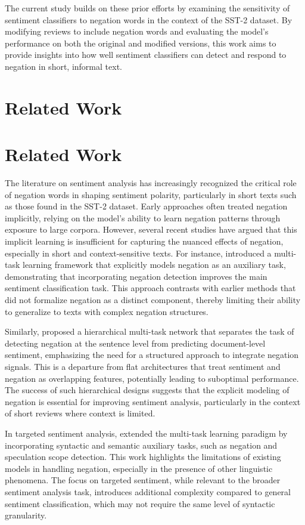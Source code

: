 \documentclass{article}
\begin{document}
The current study builds on these prior efforts by examining the sensitivity of sentiment classifiers to negation words in the context of the SST-2 dataset. By modifying reviews to include negation words and evaluating the model's performance on both the original and modified versions, this work aims to provide insights into how well sentiment classifiers can detect and respond to negation in short, informal text.
\section{Related Work}
\section{Related Work}

The literature on sentiment analysis has increasingly recognized the critical role of negation words in shaping sentiment polarity, particularly in short texts such as those found in the SST-2 dataset. Early approaches often treated negation implicitly, relying on the model's ability to learn negation patterns through exposure to large corpora. However, several recent studies have argued that this implicit learning is insufficient for capturing the nuanced effects of negation, especially in short and context-sensitive texts. For instance, \cite{DBLP:journals/corr/abs-1906-07610} introduced a multi-task learning framework that explicitly models negation as an auxiliary task, demonstrating that incorporating negation detection improves the main sentiment classification task. This approach contrasts with earlier methods that did not formalize negation as a distinct component, thereby limiting their ability to generalize to texts with complex negation structures.

Similarly, \cite{DBLP:journals/corr/abs-1906-07599} proposed a hierarchical multi-task network that separates the task of detecting negation at the sentence level from predicting document-level sentiment, emphasizing the need for a structured approach to integrate negation signals. This is a departure from flat architectures that treat sentiment and negation as overlapping features, potentially leading to suboptimal performance. The success of such hierarchical designs suggests that the explicit modeling of negation is essential for improving sentiment analysis, particularly in the context of short reviews where context is limited.

In targeted sentiment analysis, \cite{DBLP:journals/corr/abs-2010-08318} extended the multi-task learning paradigm by incorporating syntactic and semantic auxiliary tasks, such as negation and speculation scope detection. This work highlights the limitations of existing models in handling negation, especially in the presence of other linguistic phenomena. The focus on targeted sentiment, while relevant to the broader sentiment analysis task, introduces additional complexity compared to general sentiment classification, which may not require the same level of syntactic granularity.
\end{document}
